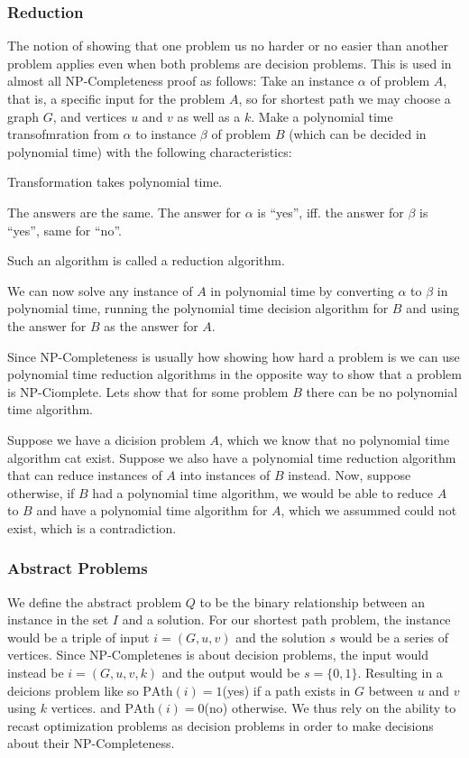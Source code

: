 \subsubsection{Reduction}
The notion of showing that one problem us no harder or no easier than another
problem applies even when both problems are decision problems. This is used in
almost all NP-Completeness proof as follows: Take an instance $\alpha$ of
problem $A$, that is, a specific input for the problem $A$, so for shortest path
we may choose a graph $G$, and vertices $u$ and $v$ as well as a $k$. Make a
polynomial time transofmration from $\alpha$ to instance $\beta$ of problem $B$
(which can be decided in polynomial time) with the following characteristics:
\begin{enumerate*}
\item Transformation takes polynomial time.
\item The answers are the same. The answer for $\alpha$ is ``yes'', iff. the
  answer for $\beta$ is ``yes'', same for ``no''.
\end{enumerate*}
Such an algorithm is called a reduction algorithm.

We can now solve any instance of $A$ in polynomial time by converting $\alpha$
to $\beta$ in polynomial time, running the polynomial time decision algorithm
for $B$ and using the answer for $B$ as the answer for $A$.


Since NP-Completeness is usually how showing how hard a problem is we can use polynomial time reduction algorithms in the opposite way to show that a problem is NP-Ciomplete. Lets show that for some problem $B$ there can be no polynomial time algorithm.

Suppose we have a dicision problem $A$, which we know that no polynomial time algorithm cat exist. Suppose we also have a polynomial time reduction algorithm that can reduce instances of $A$ into instances of $B$ instead. Now, suppose otherwise, if $B$ had a polynomial time algorithm, we would be able to reduce $A$ to $B$ and have a polynomial time algorithm for $A$, which we assummed could not exist, which is a contradiction.

\subsubsection{Abstract Problems}
We define the abstract problem $Q$ to be the binary relationship between an instance in the set $I$ and a solution.
For our shortest path problem, the instance would be a triple of input $i = (G,u,v)$ and the solution $s$ would be a series of vertices. Since NP-Completenes is about decision problems, the input would instead be $i = (G,u,v,k)$ and the output would be $s = \{0,1\}$. Resulting in a deicions problem like so $\text{PAth}(i) = 1$(yes) if a path exists in $G$ between $u$ and $v$ using $k$ vertices. and $\text{PAth}(i) = 0$(no) otherwise. We thus rely on the ability to recast optimization problems as decision problems in order to make decisions about their NP-Completeness.


